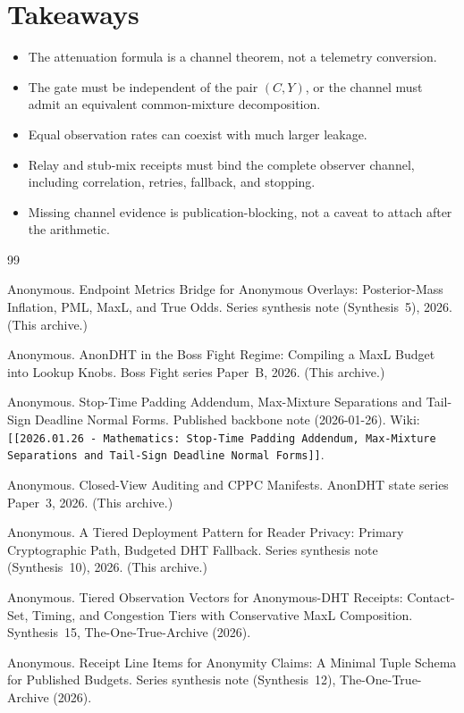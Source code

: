 \documentclass[11pt]{article}
\theoremstyle{definition}
\begin{document}
\section{Takeaways}
\begin{itemize}[leftmargin=*]
\item The attenuation formula is a channel theorem, not a telemetry conversion.
\item The gate must be independent of the pair \((C,Y)\), or the channel must admit an equivalent common-mixture decomposition.
\item Equal observation rates can coexist with much larger leakage.
\item Relay and stub-mix receipts must bind the complete observer channel, including correlation, retries, fallback, and stopping.
\item Missing channel evidence is publication-blocking, not a caveat to attach after the arithmetic.
\end{itemize}

\begin{thebibliography}{99}\small

Anonymous.
\newblock Endpoint Metrics Bridge for Anonymous Overlays: Posterior-Mass Inflation, PML, MaxL, and True Odds.
\newblock Series synthesis note (Synthesis~5), 2026. (This archive.)

Anonymous.
\newblock AnonDHT in the Boss Fight Regime: Compiling a MaxL Budget into Lookup Knobs.
\newblock Boss Fight series Paper~B, 2026. (This archive.)


Anonymous.
\newblock Stop-Time Padding Addendum, Max-Mixture Separations and Tail-Sign Deadline Normal Forms.
\newblock Published backbone note (2026-01-26). Wiki: \texttt{[[2026.01.26 - Mathematics: Stop-Time Padding Addendum, Max-Mixture Separations and Tail-Sign Deadline Normal Forms]]}.

Anonymous.
\newblock Closed-View Auditing and CPPC Manifests.
\newblock AnonDHT state series Paper~3, 2026. (This archive.)

Anonymous.
\newblock A Tiered Deployment Pattern for Reader Privacy: Primary Cryptographic Path, Budgeted DHT Fallback.
\newblock Series synthesis note (Synthesis~10), 2026. (This archive.)


Anonymous.
\newblock Tiered Observation Vectors for Anonymous-DHT Receipts: Contact-Set, Timing, and Congestion Tiers with Conservative MaxL Composition.
\newblock Synthesis~15, The-One-True-Archive (2026).

Anonymous.
\newblock Receipt Line Items for Anonymity Claims: A Minimal Tuple Schema for Published Budgets.
\newblock Series synthesis note (Synthesis~12), The-One-True-Archive (2026).

\end{thebibliography}
\end{document}
